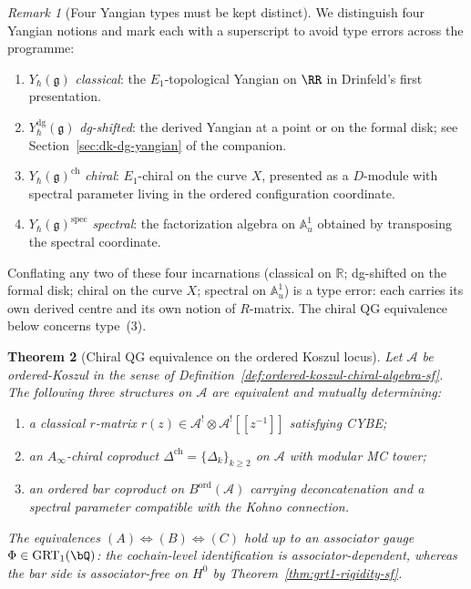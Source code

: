 \documentclass[11pt]{article}
\theoremstyle{plain}
\newtheorem{theorem}{Theorem}[section]
\theoremstyle{definition}
\theoremstyle{remark}
\newtheorem{remark}[theorem]{Remark}
\newcommand{\fg}{\mathfrak{g}}
\newcommand{\cA}{\mathcal{A}}
\begin{document}
\begin{remark}[Four Yangian types must be kept
distinct]\label{rem:four-yangian-types-sf}
We distinguish four Yangian notions and mark each with a superscript
to avoid type errors across the programme:
\begin{enumerate}[label=\textup{(\arabic*)}]
 \item $Y_\hbar(\fg)$ \emph{classical}: the $E_1$-topological Yangian
 on $\RR$ in Drinfeld's first presentation.
 \item $Y^{\mathrm{dg}}_\hbar(\fg)$ \emph{dg-shifted}: the derived
 Yangian at a point or on the formal disk; see
 Section~\ref{sec:dk-dg-yangian} of the companion.
 \item $Y_\hbar(\fg)^{\mathrm{ch}}$ \emph{chiral}: $E_1$-chiral on the
 curve $X$, presented as a $D$-module with spectral parameter
 living in the ordered configuration coordinate.
 \item $Y_\hbar(\fg)^{\mathrm{spec}}$ \emph{spectral}: the
 factorization algebra on $\mathbb{A}^1_u$ obtained by transposing
 the spectral coordinate.
\end{enumerate}
Conflating any two of these four incarnations (classical on
$\mathbb{R}$; dg-shifted on the formal disk; chiral on the curve $X$;
spectral on $\mathbb{A}^{1}_{u}$) is a type error: each carries its
own derived centre and its own notion of $R$-matrix. The chiral QG
equivalence below concerns type~(3).
\end{remark}

\begin{theorem}[Chiral QG equivalence on the ordered Koszul locus]
\label{thm:chiral-qg-equiv-ordered-sf}
\ClaimStatusProvedElsewhere
Let $\cA$ be ordered-Koszul in the sense of
Definition~\ref{def:ordered-koszul-chiral-algebra-sf}. The following
three structures on $\cA$ are equivalent and mutually determining:
\begin{enumerate}[label=\textup{(\Alph*)}]
 \item a classical $r$-matrix
 $r(z) \in \cA^{!}\otimes\cA^{!}[\![z^{-1}]\!]$ satisfying CYBE;
 \item an $A_\infty$-chiral coproduct
 $\Delta^{\mathrm{ch}} = \{\Delta_k\}_{k \geq 2}$ on $\cA$ with
 modular MC tower;
 \item an ordered bar coproduct on $B^{\mathrm{ord}}(\cA)$ carrying
 deconcatenation and a spectral parameter compatible with the
 Kohno connection.
\end{enumerate}
The equivalences $(A)\Leftrightarrow(B)\Leftrightarrow(C)$ hold up to
an associator gauge $\Phi \in \mathrm{GRT}_1(\bQ)$: the cochain-level
identification is associator-dependent, whereas the bar side is
associator-free on $H^0$ by Theorem~\ref{thm:grt1-rigidity-sf}.
\end{theorem}
\end{document}
